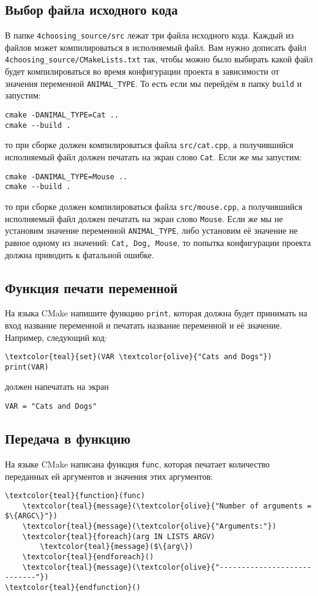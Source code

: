 \documentclass{article}
\begin{document}
\subsection{Выбор файла исходного кода}
В папке \texttt{4choosing\_source/src} лежат три файла исходного кода. Каждый из файлов может компилироваться в исполняемый файл. Вам нужно дописать файл \texttt{4choosing\_source/CMakeLists.txt} так, чтобы можно было выбирать какой файл будет компилироваться во время конфигурации проекта в зависимости от значения переменной \texttt{ANIMAL\_TYPE}. То есть если мы перейдём в папку \texttt{build} и запустим:
\begin{verbatim}
cmake -DANIMAL_TYPE=Cat ..
cmake --build .
\end{verbatim}
то при сборке должен компилироваться файла \texttt{src/cat.cpp}, а получившийся исполняемый файл должен печатать на экран слово \texttt{Cat}.
Если же мы запустим:
\begin{verbatim}
cmake -DANIMAL_TYPE=Mouse ..
cmake --build .
\end{verbatim}
то при сборке должен компилироваться файла \texttt{src/mouse.cpp}, а получившийся исполняемый файл должен печатать на экран слово \texttt{Mouse}.
Если же мы не установим значение переменной \texttt{ANIMAL\_TYPE}, либо установим её значение не равное одному из значений: \texttt{Cat, Dog, Mouse}, то попытка конфигурации проекта должна приводить к фатальной ошибке.


\subsection{Функция печати переменной}
На языка CMake напишите функцию \texttt{print}, которая должна будет принимать на вход название переменной и печатать название переменной и её значение.
Например, следующий код:

\begin{Verbatim}[commandchars=\\\{\}]
\textcolor{teal}{set}(VAR \textcolor{olive}{"Cats and Dogs"})
print(VAR)
\end{Verbatim}
должен напечатать на экран 
\begin{verbatim}
VAR = "Cats and Dogs"
\end{verbatim}


\subsection{Передача в функцию}
На языке CMake написана функция \texttt{func}, которая печатает количество переданных ей аргументов и значения этих аргументов:
\begin{Verbatim}[commandchars=\\\{\}]
\textcolor{teal}{function}(func)
    \textcolor{teal}{message}(\textcolor{olive}{"Number of arguments =  $\{ARGC\}"})
    \textcolor{teal}{message}(\textcolor{olive}{"Arguments:"})
    \textcolor{teal}{foreach}(arg IN LISTS ARGV)
        \textcolor{teal}{message}($\{arg\})
    \textcolor{teal}{endforeach}()
    \textcolor{teal}{message}(\textcolor{olive}{"----------------------------"})
\textcolor{teal}{endfunction}()
\end{Verbatim}
\end{document}
